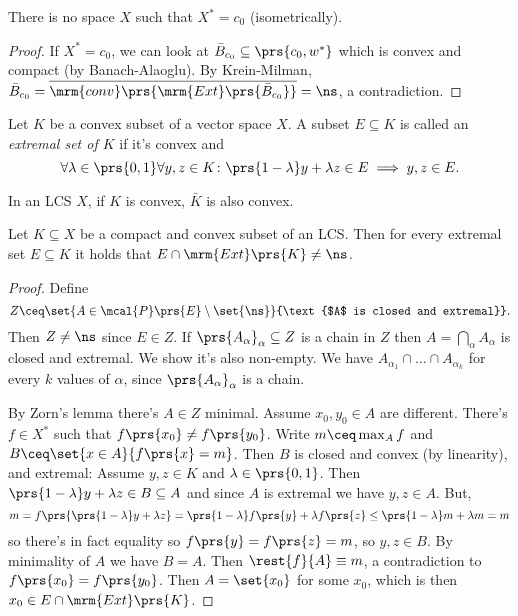 \documentclass[10pt, twoside]{book}
\begin{document}
\begin{corollary}
There is no space $X$ such that $X^* = c_0$ (isometrically).
\end{corollary}

\begin{proof}
If $X^* = c_0$, we can look at $\bar{B}_{c_0} \subseteq \prs{c_0, w^*}$ which is convex and compact (by Banach-Alaoglu).
By Krein-Milman, $\bar{B}_{c_0} = \overline{\mrm{conv}\prs{\mrm{Ext}\prs{\bar{B}_{c_0}}}} = \ns$, a contradiction.
\end{proof}

\begin{definition}
Let $K$ be a convex subset of a vector space $X$. A subset $E \subseteq K$ is called an \emph{extremal set of $K$} if it's convex and
\[\forall \lambda \in \prs{0,1} \forall y,z \in K \colon \prs{1-\lambda}y + \lambda z \in E \implies y,z \in E \text{.}\]
\end{definition}

\begin{lemma}
In an LCS $X$, if $K$ is convex, $\bar{K}$ is also convex.
\end{lemma}

\begin{lemma}
Let $K \subseteq X$ be a compact and convex subset of an LCS. Then for every extremal set $E \subseteq K$ it holds that $E \cap \mrm{Ext}\prs{K} \neq \ns$.
\end{lemma}

\begin{proof}
Define
\[Z \ceq \set{A \in \mcal{P}\prs{E} \setminus \set{\ns}}{\text{$A$ is closed and extremal}} \text{.}\]
Then $Z \neq \ns$ since $E \in Z$. If $\prs{A_\alpha}_{\alpha} \subseteq Z$ is a chain in $Z$ then $A = \bigcap_{\alpha} A_\alpha$ is closed and extremal. We show it's also non-empty. We have $A_{\alpha_1} \cap \ldots \cap A_{\alpha_k}$ for every $k$ values of $\alpha$, since $\prs{A_\alpha}_\alpha$ is a chain.

By Zorn's lemma there's $A \in Z$ minimal. Assume $x_0,y_0 \in A$ are different. There's $f \in X^*$ such that $f\prs{x_0} \neq f\prs{y_0}$. Write $m \ceq \max_A f$ and $B \ceq \set{x \in A}{f\prs{x} = m}$. Then $B$ is closed and convex (by linearity), and extremal: Assume $y,z \in K$ and $\lambda \in \prs{0,1}$. Then $\prs{1-\lambda} y + \lambda z \in B \subseteq A$ and since $A$ is extremal we have $y,z \in A$. But, \[m = f\prs{\prs{1-\lambda}y  + \lambda z} = \prs{1-\lambda} f\prs{y} + \lambda f\prs{z} \leq \prs{1-\lambda} m + \lambda m = m\]
so there's in fact equality so $f\prs{y} = f\prs{z} = m$, so $y,z \in B$.
By minimality of $A$ we have $B = A$. Then $\rest{f}{A} \equiv m$, a contradiction to $f\prs{x_0} = f\prs{y_0}$.
Then $A = \set{x_0}$ for some $x_0$, which is then $x_0 \in E \cap \mrm{Ext}\prs{K}$.
\end{proof}
\end{document}
